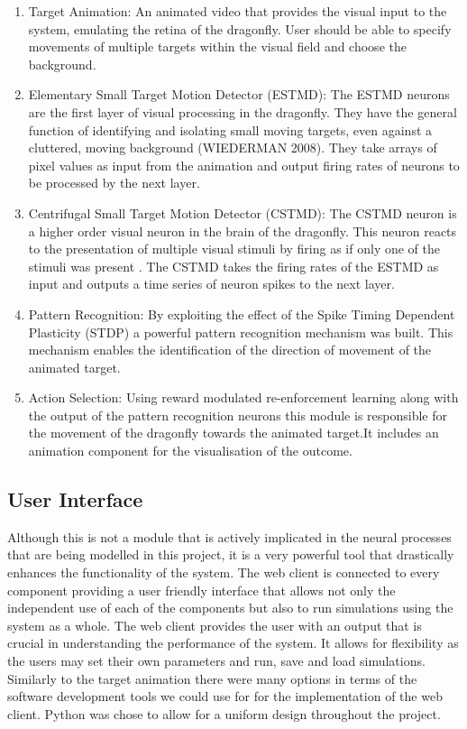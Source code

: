 \documentclass[a4paper,11pt]{article}
\begin{document}
\begin{enumerate}
\item{Target Animation:} An animated video that provides the visual input to the system, emulating the retina of the dragonfly. User should be able to specify movements of multiple targets within the visual field and choose the background.
\item{Elementary Small Target Motion Detector (ESTMD):} The ESTMD neurons are the first layer of visual processing in the dragonfly. They have the general function of identifying and isolating small moving targets, even against a cluttered, moving background (WIEDERMAN 2008). They take arrays of pixel values as input from the animation and output firing rates of neurons to be processed by the next layer.
\item{Centrifugal Small Target Motion Detector (CSTMD):} The CSTMD neuron is a higher order visual neuron in the brain of the dragonfly. This neuron reacts to the presentation of multiple visual stimuli by firing as if only one of the stimuli was present \cite{w13}. The CSTMD takes the firing rates of the ESTMD as input and outputs a time series of neuron spikes to the next layer.
\item{Pattern Recognition:} By exploiting the effect of the Spike Timing Dependent Plasticity (STDP) a powerful pattern recognition mechanism was built\cite{stdp1}\cite{stdp2}. This mechanism enables the identification of the direction of movement of the animated target.
\item{Action Selection:} Using reward modulated re-enforcement learning along with the output of the pattern recognition neurons this module is responsible for the movement of the dragonfly towards the animated target.It includes an animation component for the visualisation of the outcome.
\end{enumerate}

\subsection{User Interface}
Although this is not a module that is actively implicated in the neural processes that are being modelled in this project, it is a very powerful tool that drastically enhances the functionality of the system. The web client is connected to every component providing a user friendly interface that allows not only the independent use of each of the components but also to run simulations using the system as a whole. The web client provides the user with an output that is crucial in understanding the performance of the system. It allows for flexibility as the users may set their own parameters and run, save and load simulations. Similarly to the target animation there were many options in terms of the software development tools we could use for for the implementation of the web client. Python was chose to allow for a uniform design throughout the project.
\end{document}
